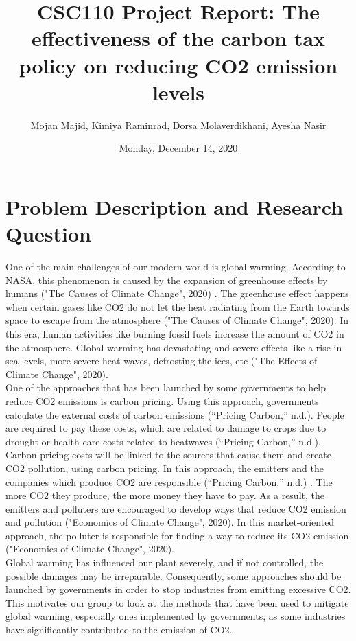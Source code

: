 \documentclass[fontsize=11pt]{article}
\title{CSC110 Project Report: The effectiveness of the carbon tax policy on reducing CO2 emission levels}
\author{Mojan Majid, Kimiya Raminrad, Dorsa Molaverdikhani, Ayesha Nasir}
\date{Monday, December 14, 2020}
\begin{document}
\maketitle

\section*{Problem Description and Research Question}


One of the main challenges of our modern world is global warming. According to NASA, this phenomenon is caused by the expansion of greenhouse effects by humans ("The Causes of Climate Change", 2020) . The greenhouse effect happens when certain gases like CO2 do not let the heat radiating from the Earth towards space to escape from the atmosphere ("The Causes of Climate Change", 2020). In this era, human activities like burning fossil fuels increase the amount of CO2 in the atmosphere. Global warming has devastating and severe effects like a rise in sea levels, more severe heat waves, defrosting the ices, etc ("The Effects of Climate Change", 2020). \\


\noindent One of the approaches that has been launched by some governments to help reduce CO2 emissions is carbon pricing. Using this approach, governments calculate the external costs of carbon emissions (“Pricing Carbon,” n.d.). People are required to pay these costs, which are related to damage to crops due to drought or health care costs related to heatwaves (“Pricing Carbon,” n.d.).\\


\noindent Carbon pricing costs will be linked to the sources that cause them and create CO2 pollution, using carbon pricing. In this approach, the emitters and the companies which produce CO2 are responsible (“Pricing Carbon,” n.d.) . The more CO2 they produce, the more money they have to pay. As a result, the emitters and polluters are encouraged to develop ways that reduce CO2 emission and pollution ("Economics of Climate Change", 2020). In this market-oriented approach, the polluter is responsible for finding a way to reduce its CO2 emission ("Economics of Climate Change", 2020). \\


\noindent Global warming has influenced our plant severely, and if not controlled, the possible damages may be irreparable. Consequently, some approaches should be launched by governments in order to stop industries from emitting excessive CO2. This motivates our group to look at the methods that have been used to mitigate global warming, especially ones implemented by governments, as some industries have significantly contributed to the emission of CO2. \\
\end{document}
